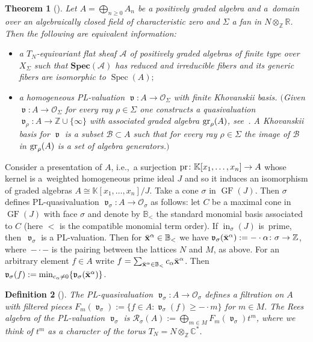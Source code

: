 \documentclass[10pt,a4paper]{amsart}
\newcommand{\thlabel}[1]{\label{#1}}
\newtheorem{Theorem}{Theorem}[section]
\newtheorem{Definition}[Theorem]{Definition}
\numberwithin{equation}{section}
\DeclareMathOperator{\init}{in}
\DeclareMathOperator{\GF}{GF}
\DeclareMathOperator{\val}{\mathfrak v}
\begin{document}
\begin{Theorem}[{\cite[Theorem~1.1]{KM-toricbundles}}]
Let $A=\bigoplus_{n\ge 0}A_n$ be a positively graded algebra and a~domain over an algebraically closed field of characteristic zero and $\Sigma$ a fan in $N\otimes_{\mathbb Z}\mathbb R$.
Then the following are equivalent information:
\begin{itemize}\itemsep=0pt
 \item[$(i)$] a $T_N$-equivariant flat sheaf $\mathcal A$ of positively graded algebras of finite type over $X_\Sigma$ such that $\mathbf{Spec}(\mathcal A)$ has reduced and irreducible fibers and its generic fibers are isomorphic to $\operatorname{Spec}(A);$
\item[$(ii)$] a homogeneous PL-valuation $\val\colon A\to \mathcal O_{\Sigma}$ with finite Khovanskii basis. $($Given $\val\colon A\to \mathcal O_{\Sigma}$ for every ray $\rho\in \Sigma$ one constructs a quasivaluation $\val_\rho\colon A\to \mathbb Z\cup \{\infty\}$ with associated graded algebra ${\rm gr}_{\rho}(A)$, see~{\rm \cite[Section~4.1]{KM-toricbundles}}. A {\it Khovanskii basis} for $\val$ is a subset $\mathcal B\subset A$ such that for every ray $\rho\in \Sigma$ the image of $\mathcal B$ in ${\rm gr}_{\rho}(A)$ is a set of algebra generators.$)$
\end{itemize}
\end{Theorem}

Consider a presentation of $A$, i.e.,~a surjection ${\rm pr}\colon \mathbb K[x_1,\dots,x_n]\to A$ whose kernel is a~weig\-hted homogeneous prime ideal $J$ and so it induces an isomorphism of graded algebras $A\cong \mathbb K[x_1,\dots,x_n]/J$.
Take a cone $\sigma$ in $\GF(J)$.
Then $\sigma$ defines PL-quasivaluation $\val_{\sigma}\colon A\to \mathcal O_\sigma$ as follows:
let $C$ be a maximal cone in $\GF(J)$ with face $\sigma$ and denote by $\mathbb B_<$ the standard monomial basis associated to $C$ (here $<$ is the compatible monomial term order).
If $\init_\sigma(J)$ is~prime, then~$\val_{\sigma}$ is a PL-valuation.
Then for $\bar{\bf x}^\alpha\in \mathbb B_<$ we have $\val_{\sigma}(\bar{\bf x}^\alpha):= -\cdot \alpha\colon \sigma\to \mathbb Z$, where~$-\cdot -$ is the pairing between the lattices $N$ and $M$, as above.
For an arbitrary element $f\in A$ write $f=\sum_{\bar{\bf x}^\alpha\in \mathbb B_<} c_\alpha \bar{\bf x}^\alpha$.
Then $\val_\sigma(f):=\min_{c_\alpha\not =0}\{\val_\sigma(\bar{\bf x}^\alpha)\}$.

\begin{Definition}[\cite{KM-toricbundles}]\thlabel{def:Rees}
The PL-quasivaluation $\val_\sigma\colon A\to\mathcal O_\sigma$ defines a {\it filtration} on $A$ with filtered pieces
$F_m(\val_\sigma):=\{f\in A\colon \val_\sigma(f)\ge -\cdot m \}$ for $m\in M$.
The {\it Rees algebra} of the PL-va\-lu\-ation $\val_\sigma$ is $\mathcal R_\sigma(A):=\bigoplus_{m\in M}F_m(\val_\sigma)t^m$, where we think of $t^m$ as a character of the torus $T_N=N\otimes_{\mathbb Z}\mathbb C^*$.
\end{Definition}
\end{document}
